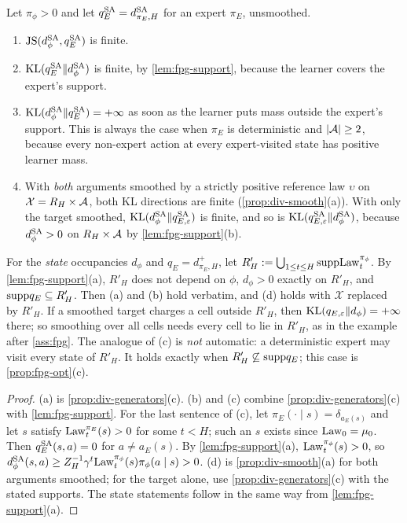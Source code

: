 \begin{corollary}\label{cor:fpg-sa-finite}
Let $\pi_\phi>0$ and let $q^{\mathrm{SA}}_E=d^{\mathrm{SA}}_{\pi_E,H}$ for an expert $\pi_E$, unsmoothed.
\begin{enumerate}[nosep,label=(\alph*)]
\item $\mathrm{JS}(d^{\mathrm{SA}}_\phi,q^{\mathrm{SA}}_E)$ is finite.
\item $\mathrm{KL}(q^{\mathrm{SA}}_E\Vert d^{\mathrm{SA}}_\phi)$ is finite, by \cref{lem:fpg-support}, because the learner covers the expert's support.
\item $\mathrm{KL}(d^{\mathrm{SA}}_\phi\Vert q^{\mathrm{SA}}_E)=+\infty$ as soon as the learner puts mass outside the expert's support. This is always the case when $\pi_E$ is deterministic and $|\mathcal{A}|\ge2$, because every non-expert action at every expert-visited state has positive learner mass.
\item With \emph{both} arguments smoothed by a strictly positive reference law $\upsilon$ on $\mathcal X=R_H\times\mathcal{A}$, both KL directions are finite (\cref{prop:div-smooth}(a)).
  With only the target smoothed, $\mathrm{KL}(d^{\mathrm{SA}}_\phi\Vert q^{\mathrm{SA}}_{E,\varepsilon})$ is finite, and so is $\mathrm{KL}(q^{\mathrm{SA}}_{E,\varepsilon}\Vert d^{\mathrm{SA}}_\phi)$, because $d^{\mathrm{SA}}_\phi>0$ on $R_H\times\mathcal{A}$ by \cref{lem:fpg-support}(b).
\end{enumerate}
For the \emph{state} occupancies $d_\phi$ and $q_E=d^+_{\pi_E,H}$, let $R'_H:=\bigcup_{1\le t\le H}\mathrm{supp}\mathrm{Law}^{\pi_\phi}_t$.
By \cref{lem:fpg-support}(a), $R'_H$ does not depend on $\phi$, $d_\phi>0$ exactly on $R'_H$, and $\mathrm{supp} q_E\subseteq R'_H$.
Then (a) and (b) hold verbatim, and (d) holds with $\mathcal X$ replaced by $R'_H$.
If a smoothed target charges a cell outside $R'_H$, then $\mathrm{KL}(q_{E,\varepsilon}\Vert d_\phi)=+\infty$ there; so smoothing over all cells needs every cell to lie in $R'_H$, as in the example after \cref{ass:fpg}.
The analogue of (c) is \emph{not} automatic: a deterministic expert may visit every state of $R'_H$.
It holds exactly when $R'_H\not\subseteq\mathrm{supp} q_E$; this case is \cref{prop:fpg-opt}(c).
\end{corollary}
\begin{proof}
(a) is \cref{prop:div-generators}(c).
(b) and (c) combine \cref{prop:div-generators}(c) with \cref{lem:fpg-support}.
For the last sentence of (c), let $\pi_E(\cdot\mid s)=\delta_{a_E(s)}$ and let $s$ satisfy $\mathrm{Law}^{\pi_E}_t(s)>0$ for some $t<H$; such an $s$ exists since $\mathrm{Law}_0=\mu_0$.
Then $q^{\mathrm{SA}}_E(s,a)=0$ for $a\ne a_E(s)$.
By \cref{lem:fpg-support}(a), $\mathrm{Law}^{\pi_\phi}_t(s)>0$, so $d^{\mathrm{SA}}_\phi(s,a)\ge Z_H^{-1}\gamma^t\mathrm{Law}^{\pi_\phi}_t(s)\pi_\phi(a\mid s)>0$.
(d) is \cref{prop:div-smooth}(a) for both arguments smoothed; for the target alone, use \cref{prop:div-generators}(c) with the stated supports.
The state statements follow in the same way from \cref{lem:fpg-support}(a).
\end{proof}

